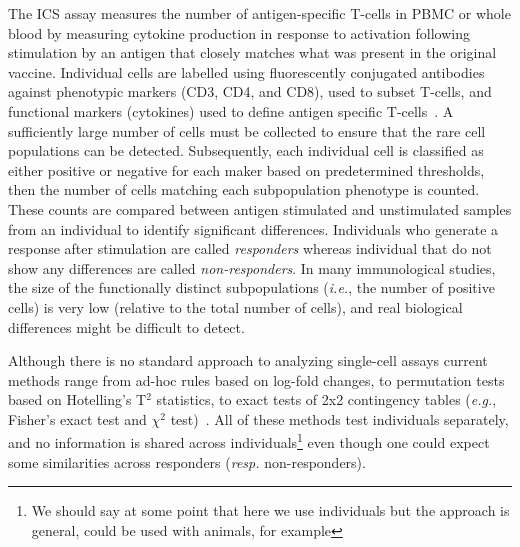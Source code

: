 \documentclass[useAMS,referee,usenatbib]{biom}
\begin{document}
The ICS assay measures the number of antigen-specific T-cells in PBMC or whole blood by measuring cytokine production in response to activation following stimulation by an antigen that closely matches what was present in the original vaccine. 
Individual cells are labelled using fluorescently conjugated antibodies against phenotypic markers (CD3, CD4, and CD8), used to subset T-cells, and functional markers (cytokines) used to define antigen specific T-cells~\citep{Horton:2007tsa,DeRosa:2004wp,Betts:2006dw}.
A sufficiently large number of cells must be collected to ensure that the rare cell populations can be detected. 
Subsequently, each individual cell is classified as either positive or negative for each maker based on predetermined thresholds, then the number of cells matching each subpopulation phenotype is counted. 
These counts are compared between antigen stimulated and unstimulated samples from an individual to identify significant differences. Individuals who generate a response after stimulation are called \textit{responders} whereas individual that do not show any differences are called \textit{non-responders}. 
In many immunological studies, the size of the functionally distinct subpopulations (\textit{i.e.}, the number of positive cells) is very low (relative to the total number of cells), and real biological differences might be difficult to detect. 

Although there is no standard approach to analyzing single-cell assays current methods range from ad-hoc rules based on log-fold changes, to permutation tests based on Hotelling's T$^2$ statistics, to exact tests of 2x2 contingency tables (\textit{e.g.}, Fisher's exact test and $\chi^2$ test)~\citep{Trigona:2003,Sinclair:2004hs,Horton:2007tsa,Nason:2006dx,Peiperl:2010ej,Proschan:2009ks}. 
All of these methods test individuals separately, and no information is shared across individuals\footnote{We should say at some point that here we use individuals but the approach is general, could be used with animals, for example} even though one could expect some similarities across responders (\textit{resp.} non-responders). %
\end{document}
